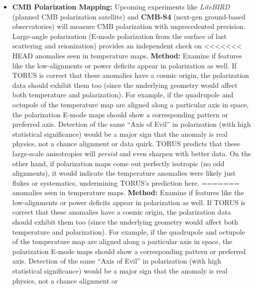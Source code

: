 \documentclass[]{article}
\begin{document}
\begin{itemize}
  \begin{itemize}
  \item
    \textbf{CMB Polarization Mapping:} Upcoming experiments like
    \emph{LiteBIRD} (planned CMB polarization satellite) and
    \textbf{CMB-S4} (next-gen ground-based observatories) will measure
    CMB polarization with unprecedented precision. Large-angle
    polarization (E-mode polarization from the surface of last
    scattering and reionization) provides an independent check on
<<<<<<< HEAD
    anomalies seen in temperature maps\hspace{0pt}. \textbf{Method:}
    Examine if features like the low-\ell alignments or power deficits
    appear in polarization as well. If TORUS is correct that these
    anomalies have a cosmic origin, the polarization data should exhibit
    them too (since the underlying geometry would affect both
    temperature and polarization). For example, if the quadrupole and
    octupole of the temperature map are aligned along a particular axis
    in space, the polarization E-mode maps should show a corresponding
    pattern or preferred axis\hspace{0pt}. Detection of the same ``Axis
    of Evil'' in polarization (with high statistical significance) would
    be a major sign that the anomaly is real physics, not a chance
    alignment or data quirk\hspace{0pt}. TORUS predicts that these
    large-scale anisotropies will \emph{persist} and even sharpen with
    better data\hspace{0pt}. On the other hand, if polarization maps
    come out perfectly isotropic (no odd alignments), it would indicate
    the temperature anomalies were likely just flukes or systematics,
    undermining TORUS's prediction here\hspace{0pt}.
=======
    anomalies seen in temperature maps​. \textbf{Method:} Examine if
    features like the low-\ell alignments or power deficits appear in
    polarization as well. If TORUS is correct that these anomalies have
    a cosmic origin, the polarization data should exhibit them too
    (since the underlying geometry would affect both temperature and
    polarization). For example, if the quadrupole and octupole of the
    temperature map are aligned along a particular axis in space, the
    polarization E-mode maps should show a corresponding pattern or
    preferred axis​. Detection of the same ``Axis of Evil'' in
    polarization (with high statistical significance) would be a major
    sign that the anomaly is real physics, not a chance alignment or

\end{itemize}
\end{itemize}
\end{document}
